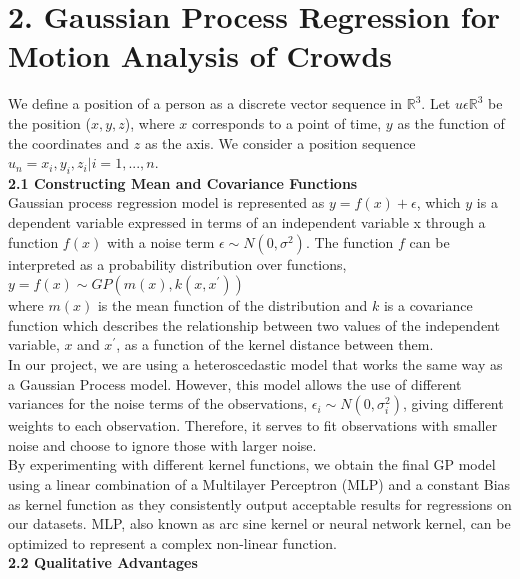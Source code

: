 \documentclass[letterpaper]{article}
\begin{document}
\section{2.  Gaussian Process Regression for Motion Analysis of Crowds}

We define a position of a person as a discrete vector sequence in $\mathbb{R}^3$. Let $u \epsilon \mathbb{R}^3$ be the position ($x, y, z$), where $x$ corresponds to a point of time, $y$ as the function of the coordinates and $z$ as the axis. We consider a position sequence $u_n = {x_i, y_i, z_i} | i = 1,...,n$. \\

{\bf2.1  Constructing Mean and Covariance Functions} \\

Gaussian process regression model is represented as $y = f(x) + \epsilon$, which $y$ is a dependent variable expressed in terms of an independent variable x through a function $f(x)$ with a noise term $\epsilon \sim N(0, \sigma^2)$. The function $f$ can be interpreted as a probability distribution over functions, \\

$ y = f(x) \sim GP(m(x), k(x,x^\prime))$ \\

where $m(x)$ is the mean function of the distribution and $k$ is a covariance function which describes the relationship between two values of the independent variable, $x$ and $x^\prime$, as a function of the kernel distance between them. \\

In our project, we are using a heteroscedastic model that works the same way as a Gaussian Process model. However, this model allows the use of different variances for the noise terms of the observations, $\epsilon_i \sim N(0, \sigma_i^2)$, giving different weights to each observation. Therefore, it serves to fit observations with smaller noise and choose to ignore those with larger noise. \\

By experimenting with different kernel functions, we obtain the final GP model using a linear combination of a Multilayer Perceptron (MLP) and a constant Bias as kernel function as they consistently output acceptable results for regressions on our datasets. MLP, also known as arc sine kernel or neural network kernel, can be optimized to represent a complex non-linear function. \\

{\bf2.2  Qualitative Advantages} \\
\end{document}
